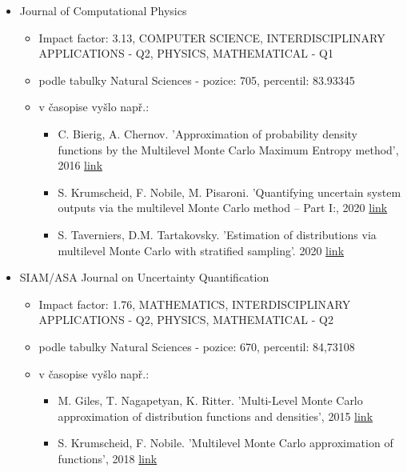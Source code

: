 \documentclass[a4paper]{article}
\begin{document}
\begin{itemize}
\item Journal of Computational Physics
\begin{itemize}
\item Impact factor: 3.13, COMPUTER SCIENCE, INTERDISCIPLINARY APPLICATIONS - Q2, PHYSICS, MATHEMATICAL - Q1
\item podle tabulky Natural Sciences - pozice: 705, percentil: 83.93345
\item v časopise vyšlo např.:
\begin{itemize}
\item C. Bierig, A. Chernov. 'Approximation of probability density functions by the Multilevel Monte Carlo Maximum Entropy method', 2016 \href{https://www.sciencedirect.com/science/article/pii/S0021999116001790}{link}
\item S. Krumscheid, F. Nobile, M. Pisaroni. 'Quantifying uncertain system outputs via the multilevel Monte Carlo method -- Part I:, 2020 \href{https://www.sciencedirect.com/science/article/pii/S0021999120302400}{link}
\item S. Taverniers, D.M. Tartakovsky. 'Estimation of distributions via multilevel Monte Carlo with stratified sampling'. 2020 \href{https://www.sciencedirect.com/science/article/pii/S0021999120303466}{link}
\end{itemize}
\end{itemize}


\item SIAM/ASA Journal on Uncertainty Quantification
\begin{itemize}
\item Impact factor: 1.76, MATHEMATICS, INTERDISCIPLINARY APPLICATIONS - Q2, PHYSICS, MATHEMATICAL - Q2
\item podle tabulky Natural Sciences - pozice: 670, percentil: 84,73108
\item v časopise vyšlo např.:
\begin{itemize}
\item M. Giles, T. Nagapetyan, K. Ritter. 'Multi-Level Monte Carlo approximation of distribution functions and densities', 2015 \href{https://people.maths.ox.ac.uk/gilesm/files/juq_15.pdf}{link}
\item S. Krumscheid, F. Nobile. 'Multilevel Monte Carlo approximation of functions', 2018 \href{https://epubs.siam.org/doi/10.1137/17M1135566}{link}
\end{itemize}
\end{itemize}


\end{itemize}
\end{document}
